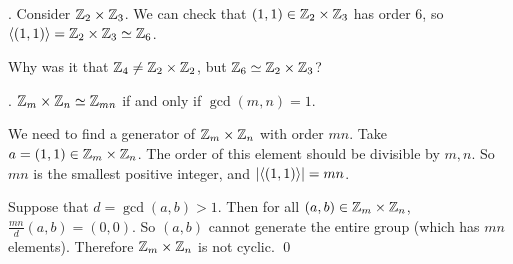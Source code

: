 \ex. Consider \(\mathbb{Z}_2 \times \mathbb{Z}_3\). We can check that \((1, 1) \in \mathbb{Z}_2 \times \mathbb{Z}_3\) has order 6, so \(\left\langle (1, 1) \right\rangle = \mathbb{Z}_2 \times \mathbb{Z}_3 \simeq \mathbb{Z}_6\).

Why was it that \(\mathbb{Z}_4 \neq \mathbb{Z}_2 \times \mathbb{Z}_2\), but \(\mathbb{Z}_6 \simeq \mathbb{Z}_2 \times \mathbb{Z}_3\)?

\thm. \(\mathbb{Z}_m \times \mathbb{Z}_n \simeq \mathbb{Z}_{mn}\) if and only if \(\gcd(m, n) = 1\).

\pf \note{\mimpd} We need to find a generator of \(\mathbb{Z}_m \times \mathbb{Z}_n\) with order \(mn\). Take \(a = (1, 1) \in \mathbb{Z}_m \times \mathbb{Z}_n\). The order of this element should be divisible by \(m, n\). So \(mn\) is the smallest positive integer, and \(\left| \left\langle (1, 1) \right\rangle \right| = mn\).

\note{\mimp} Suppose that \(d = \gcd(a, b) > 1\). Then for all \((a, b) \in \mathbb{Z}_m \times \mathbb{Z}_n\), \(\frac{mn}{d}(a, b) = (0, 0)\). So \((a, b)\) cannot generate the entire group (which has \(mn\) elements). Therefore \(\mathbb{Z}_m \times \mathbb{Z}_n\) is not cyclic. \qed

\smallskip

